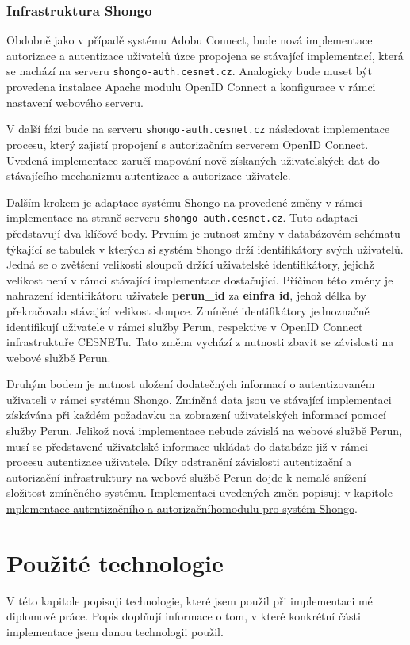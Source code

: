 \documentclass[
  printed, %
  twoside, %
  table,   %
  nolof,     %
  nolot,     %
]{fithesis3}
\begin{document}
\subsection{Infrastruktura Shongo}
Obdobně jako v případě systému Adobu Connect, bude nová implementace autorizace a autentizace uživatelů úzce propojena se stávající implementací, která se nachází na serveru \texttt{shongo-auth.cesnet.cz}. Analogicky bude muset být provedena instalace Apache modulu OpenID Connect a konfigurace v rámci nastavení webového serveru. \par
V další fázi bude na serveru \texttt{shongo-auth.cesnet.cz} následovat implementace procesu, který zajistí propojení s autorizačním serverem OpenID Connect. Uvedená implementace zaručí mapování nově získaných uživatelských dat do stávajícího mechanizmu autentizace a autorizace uživatele. \par
Dalším krokem je adaptace systému Shongo na provedené změny v rámci implementace na straně serveru \texttt{shongo-auth.cesnet.cz}. Tuto adaptaci představují dva klíčové body. Prvním je nutnost změny v databázovém schématu týkající se tabulek v kterých si systém Shongo drží identifikátory svých uživatelů. Jedná se o zvětšení velikosti sloupců držící uživatelské identifikátory, jejichž velikost není v rámci stávající implementace dostačující. Příčinou této změny je nahrazení identifikátoru uživatele \textbf{perun\_id} za \textbf{einfra id}, jehož délka by překračovala stávající velikost sloupce. Zmíněné identifikátory jednoznačně identifikují uživatele v rámci služby Perun, respektive v OpenID Connect infrastruktuře CESNETu. Tato změna vychází z nutnosti zbavit se závislosti na webové službě Perun. \par

Druhým bodem je nutnost uložení dodatečných informací o autentizovaném uživateli v rámci systému Shongo. Zmíněná data jsou ve stávající implementaci získávána při každém požadavku na zobrazení uživatelských informací pomocí služby Perun. Jelikož nová implementace nebude závislá na webové službě Perun, musí se představené uživatelské informace ukládat do databáze již v rámci procesu autentizace uživatele. Díky odstranění závislosti autentizační a autorizační infrastruktury na webové službě Perun dojde k nemalé snížení složitost zmíněného systému. Implementaci uvedených změn popisuji v kapitole \hyperref[ShongoImpl]{mplementace autentizačního a autorizačníhomodulu pro systém Shongo}.

\chapter{Použité technologie}
V této kapitole popisuji technologie, které jsem použil při implementaci mé diplomové práce. Popis doplňují informace o tom, v které konkrétní části implementace jsem danou technologii použil.
\end{document}
